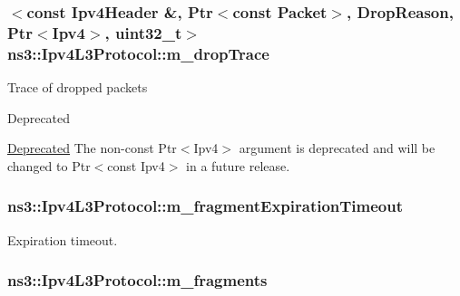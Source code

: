 \subsubsection[{\texorpdfstring{m\+\_\+drop\+Trace}{m_dropTrace}}]{$<$const {\bf Ipv4\+Header} \&, {\bf Ptr}$<$const {\bf Packet}$>$, {\bf Drop\+Reason}, {\bf Ptr}$<${\bf Ipv4}$>$, uint32\+\_\+t$>$ ns3\+::\+Ipv4\+L3\+Protocol\+::m\+\_\+drop\+Trace\hspace{0.3cm}{\ttfamily [private]}}\hypertarget{classns3_1_1Ipv4L3Protocol_a80984e2de6a2562b04195b975014cb1b}{}\label{classns3_1_1Ipv4L3Protocol_a80984e2de6a2562b04195b975014cb1b}
Trace of dropped packets \begin{DoxyRefDesc}{Deprecated}
\item[\hyperlink{deprecated__deprecated000010}{Deprecated}]The non-\/const {\ttfamily Ptr$<$\+Ipv4$>$} argument is deprecated and will be changed to {\ttfamily Ptr$<$const Ipv4$>$} in a future release. \end{DoxyRefDesc}
\subsubsection[{\texorpdfstring{m\+\_\+fragment\+Expiration\+Timeout}{m_fragmentExpirationTimeout}}]{ ns3\+::\+Ipv4\+L3\+Protocol\+::m\+\_\+fragment\+Expiration\+Timeout\hspace{0.3cm}{\ttfamily [private]}}\hypertarget{classns3_1_1Ipv4L3Protocol_a6ad1c5e5d4bde4a903aadab94c6ec164}{}\label{classns3_1_1Ipv4L3Protocol_a6ad1c5e5d4bde4a903aadab94c6ec164}


Expiration timeout. 

\subsubsection[{\texorpdfstring{m\+\_\+fragments}{m_fragments}}]{ ns3\+::\+Ipv4\+L3\+Protocol\+::m\+\_\+fragments\hspace{0.3cm}{\ttfamily [private]}}\hypertarget{classns3_1_1Ipv4L3Protocol_a0eb853df4608f63e9447d8a33d427ccf}{}\label{classns3_1_1Ipv4L3Protocol_a0eb853df4608f63e9447d8a33d427ccf}



